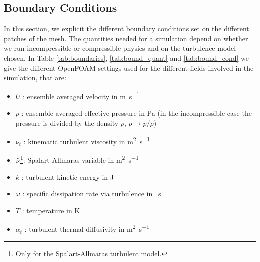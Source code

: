 \begin{subappendices}
	\section{Boundary Conditions}\label{ap:boundary}
	In this section, we explicit the different boundary conditions set on the different patches of the mesh. The quantities needed for a simulation depend on whether we run incompressible or compressible physics and on the turbulence model chosen. In Table \ref{tab:boundaries}, \ref{tab:bound_quant} and \ref{tab:bound_cond} we give the different OpenFOAM settings used for the different fields involved in the simulation, that are:
	\begin{itemize}
		\item $U$ : ensemble averaged velocity in \si{\meter\per\second}
		\item $p$ : ensemble averaged effective pressure in \si{\pascal} (in the incompressible case the pressure is divided by the density $\rho$, $p\rightarrow p/\rho$)
		\item $\nu_t$ : kinematic turbulent viscosity in \si{\square\meter\per\second}
		\item $\Tilde{\nu}$\footnote{Only for the Spalart-Allmaras turbulent model.}: Spalart-Allmaras variable in \si{\square\meter\per\second}
		\item $k$\footnotemark[2]{} : turbulent kinetic energy in \si{\joule}
		\item $\omega$\footnotemark[2]{} : specific dissipation rate via turbulence in \si{\per\second}
		\item $T$\footnotemark[3]{} : temperature in \si{\kelvin}
		\item $\alpha_t$\footnotemark[3]{} : turbulent thermal diffusivity in \si{\square\meter\per\second}
	\end{itemize}
	

\end{subappendices}
